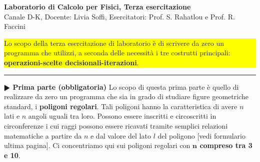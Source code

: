 \documentclass[11pt]{article}
\begin{document}
\pagestyle{empty}

\begin{center}
{\Large \bf  Laboratorio di Calcolo per Fisici, Terza esercitazione\\[2mm]}
{\large Canale D-K, Docente: Livia Soffi, Esercitatori: Prof. S. Rahatlou e Prof. R. Faccini}
\end{center}
\vspace{4mm}

\colorbox{yellow}{\begin{minipage}{17cm}
  Lo scopo della terza esercitazione di laboratorio \`e di scrivere da zero un programma che utilizzi, a seconda delle necessit\`a i tre costrutti principali: \textbf{operazioni-scelte decisionali-iterazioni}.
\end{minipage}}
\vspace{2mm}
%
%

\hrule
\vspace{2mm}
\vspace{2mm}
\textbf{$\RHD$ Prima parte (obbligatoria)} 
Lo scopo di questa prima parte \`e quello di realizzare da zero un programma che  sia in grado di studiare figure geometriche standard, i \textbf{poligoni regolari}. Tali poligoni hanno la caratteristica di avere $n$ lati e $n$ angoli uguali tra loro. Possono essere inscritti e circoscritti in circonferenze i cui raggi possono essere ricavati tramite semplici relazioni matematiche a partire da $n$ e dal valore del lato $l$ del poligono [vedi formulario ultima pagina]. Ci concentriamo qui sui poligoni regolari con \textbf{$\bm{n}$ compreso tra 3 e 10}. 
\end{document}

